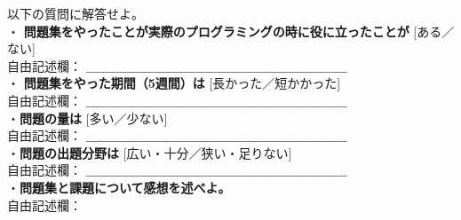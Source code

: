 
\toi
以下の質問に解答せよ。\\
・{\bfseries\small
問題集をやったことが実際のプログラミングの時に役に立ったことが}
[{\scriptsize ある／ない}]\\
{\scriptsize 自由記述欄：}
＿＿＿＿＿＿＿＿＿＿＿＿＿＿＿＿＿＿＿＿＿\\
・{\bfseries\small
 問題集をやった期間{\scriptsize （5週間）}は}
[{\scriptsize 長かった／短かかった}]\\
{\scriptsize 自由記述欄：}
＿＿＿＿＿＿＿＿＿＿＿＿＿＿＿＿＿＿＿＿＿\\
・{\bfseries\small 問題の量は}
[{\scriptsize 多い／少ない}]\\
{\scriptsize 自由記述欄：}
＿＿＿＿＿＿＿＿＿＿＿＿＿＿＿＿＿＿＿＿＿\\
・{\bfseries\small 問題の出題分野は}
[{\scriptsize 広い・十分／狭い・足りない}]\\
{\scriptsize 自由記述欄：}
＿＿＿＿＿＿＿＿＿＿＿＿＿＿＿＿＿＿＿＿＿\\
・{\bfseries\small 問題集と課題について感想を述べよ。}\\
{\scriptsize 自由記述欄：}\\

